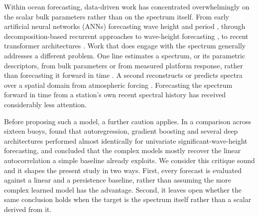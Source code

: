 Within ocean forecasting, data-driven work has concentrated overwhelmingly on the scalar bulk
parameters rather than on the spectrum itself. From
early artificial neural networks (ANNs) forecasting wave height and period
\citep{makarynskyy2004}, through decomposition-based recurrent approaches to wave-height
forecasting \citep{zhou2021emdlstm, ding2023eofeemd}, to recent transformer architectures
\citep{kim2026metoformer}. Work that does engage with the spectrum generally addresses a different
problem. One line estimates a spectrum, or its parametric descriptors, from bulk parameters or
from measured platform response, rather than forecasting it forward in time
\citep{naithani2005ann, namekar2006ann, sakhare2009svr, nielsen2023shipbuoy, kwon2026transformer}.
A second reconstructs or predicts spectra over a spatial domain from atmospheric forcing
\citep{song2023jpo, gao2025jgr, liu2025cnnxlstm, cao2025bohai}. Forecasting the spectrum forward
in time from a station's own recent spectral history has received considerably less attention.

Before proposing such a model, a further caution applies. In a comparison across sixteen buoys,
\citet{jiang2024comment} found that autoregression, gradient boosting and several deep
architectures performed almost identically for univariate significant-wave-height forecasting,
and concluded that the complex models mostly recover the linear autocorrelation a simple baseline
already exploits. We consider this critique sound and it shapes the present
study in two ways. First, every forecast is evaluated against a linear and a persistence baseline,
rather than assuming the more complex learned model has the advantage. Second, it leaves open whether the same conclusion holds when the target is the spectrum itself rather than a scalar derived from it.

